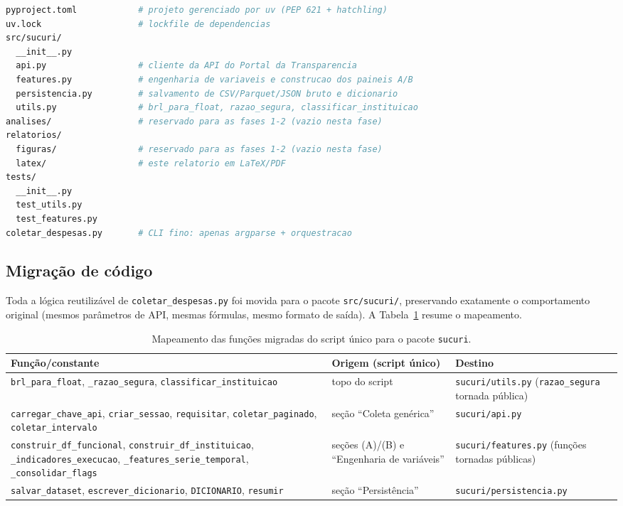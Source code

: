 \documentclass[11pt,a4paper]{article}
\begin{document}
\begin{lstlisting}[language=bash]
pyproject.toml            # projeto gerenciado por uv (PEP 621 + hatchling)
uv.lock                   # lockfile de dependencias
src/sucuri/
  __init__.py
  api.py                  # cliente da API do Portal da Transparencia
  features.py             # engenharia de variaveis e construcao dos paineis A/B
  persistencia.py         # salvamento de CSV/Parquet/JSON bruto e dicionario
  utils.py                # brl_para_float, razao_segura, classificar_instituicao
analises/                 # reservado para as fases 1-2 (vazio nesta fase)
relatorios/
  figuras/                # reservado para as fases 1-2 (vazio nesta fase)
  latex/                  # este relatorio em LaTeX/PDF
tests/
  __init__.py
  test_utils.py
  test_features.py
coletar_despesas.py       # CLI fino: apenas argparse + orquestracao
\end{lstlisting}

\subsection{Migração de código}

Toda a lógica reutilizável de \texttt{coletar\_despesas.py} foi movida para o
pacote \texttt{src/sucuri/}, preservando exatamente o comportamento original
(mesmos parâmetros de API, mesmas fórmulas, mesmo formato de saída).
A Tabela~\ref{tab:migracao} resume o mapeamento.

\begin{table}[h]
\centering
\small
\begin{tabular}{@{}p{4.2cm}p{4.2cm}p{4.6cm}@{}}
\toprule
\textbf{Função/constante} & \textbf{Origem (script único)} & \textbf{Destino} \\
\midrule
\texttt{brl\_para\_float}, \texttt{\_razao\_segura}, \texttt{classificar\_instituicao} &
topo do script &
\texttt{sucuri/utils.py} (\texttt{razao\_segura} tornada pública) \\
\addlinespace
\texttt{carregar\_chave\_api}, \texttt{criar\_sessao}, \texttt{requisitar}, \texttt{coletar\_paginado}, \texttt{coletar\_intervalo} &
seção ``Coleta genérica'' &
\texttt{sucuri/api.py} \\
\addlinespace
\texttt{construir\_df\_funcional}, \texttt{construir\_df\_instituicao}, \texttt{\_indicadores\_execucao}, \texttt{\_features\_serie\_temporal}, \texttt{\_consolidar\_flags} &
seções (A)/(B) e ``Engenharia de variáveis'' &
\texttt{sucuri/features.py} (funções tornadas públicas) \\
\addlinespace
\texttt{salvar\_dataset}, \texttt{escrever\_dicionario}, \texttt{DICIONARIO}, \texttt{resumir} &
seção ``Persistência'' &
\texttt{sucuri/persistencia.py} \\
\bottomrule
\end{tabular}
\caption{Mapeamento das funções migradas do script único para o pacote \texttt{sucuri}.}
\label{tab:migracao}
\end{table}
\end{document}
